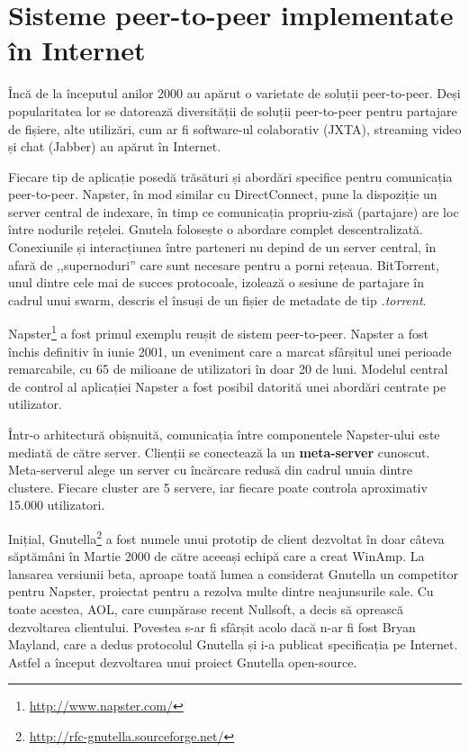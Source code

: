\section{Sisteme peer-to-peer implementate în Internet}
\label{sec:p2p-systems:p2p-internet}

Încă de la începutul anilor 2000 au apărut o varietate de soluții peer-to-peer.
Deși popularitatea lor se datorează diversității de soluții peer-to-peer pentru
partajare de fișiere, alte utilizări, cum ar fi software-ul colaborativ
(JXTA), streaming video și chat (Jabber) au apărut în Internet.

Fiecare tip de aplicație posedă trăsături și abordări specifice pentru
comunicația peer-to-peer. Napster, în mod similar cu DirectConnect,
pune la dispoziție un server central de indexare, în timp ce comunicația
propriu-zisă (partajare) are loc între nodurile rețelei. Gnutela folosește
o abordare complet descentralizată. Conexiunile și interacțiunea
între parteneri nu depind de un server central, în afară de ,,supernoduri''
care sunt necesare pentru a porni rețeaua. BitTorrent, unul dintre cele
mai de succes protocoale, izolează o sesiune de partajare în cadrul unui
swarm, descris el însuși de un fișier de metadate de tip \textit{.torrent}.

Napster\footnote{\url{http://www.napster.com/}} a fost primul exemplu
reușit de sistem peer-to-peer. Napster a fost închis definitiv în iunie 2001,
un eveniment care a marcat sfârșitul unei perioade remarcabile, cu 65 de
milioane de utilizatori în doar 20 de luni. Modelul central de control
al aplicației Napster a fost posibil datorită unei abordări centrate pe
utilizator.

Într-o arhitectură obișnuită, comunicația între componentele Napster-ului
este mediată de către server. Clienții se conectează la un \textbf{meta-server}
cunoscut. Meta-serverul alege un server cu încărcare redusă din cadrul
unuia dintre clustere. Fiecare cluster are 5 servere, iar fiecare poate
controla aproximativ 15.000 utilizatori.

Inițial, Gnutella\footnote{\url{http://rfc-gnutella.sourceforge.net/}}
a fost numele unui prototip de client dezvoltat în doar câteva săptămâni
în Martie 2000 de către aceeași echipă care a creat WinAmp. La lansarea
versiunii beta, aproape toată lumea a considerat Gnutella un competitor
pentru Napster, proiectat pentru a rezolva multe dintre neajunsurile sale.
Cu toate acestea, AOL, care cumpărase recent Nullsoft, a decis să oprească
dezvoltarea clientului. Povestea s-ar fi sfârșit acolo dacă n-ar fi fost
Bryan Mayland, care a dedus protocolul Gnutella și i-a publicat specificația
pe Internet. Astfel a început dezvoltarea unui proiect Gnutella open-source.

